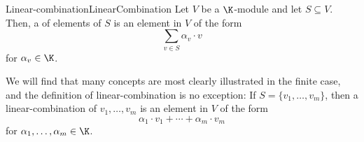 \begin{dfn}{Linear-combination}{LinearCombination}
	Let $V$ be a $\K$-module and let $S\subseteq V$.  Then, a  of elements of $S$ is an element in $V$ of the form
	\begin{equation}
	\sum _{v\in S}\alpha _v\cdot v
	\end{equation}
	for $\alpha _v\in \K$.
	\begin{rmk}
		We will find that many concepts are most clearly illustrated in the finite case, and the definition of linear-combination is no exception:  If $S=\{ v_1,\ldots ,v_m\}$, then a linear-combination of $v_1,\ldots ,v_m$ is an element in $V$ of the form
		\begin{equation}
		\alpha _1\cdot v_1+\cdots +\alpha _m\cdot v_m
		\end{equation}
		for $\alpha _1,\ldots ,\alpha _m\in \K$.
	\end{rmk}
\end{dfn}
